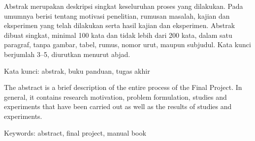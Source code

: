 
Abstrak merupakan deskripsi singkat keseluruhan proses  yang dilakukan. Pada umumnya berisi tentang motivasi penelitian, rumusan masalah, kajian dan eksperimen yang telah dilakukan serta hasil kajian dan eksperimen. Abstrak dibuat singkat, minimal 100 kata dan tidak lebih dari 200 kata, dalam satu paragraf, tanpa gambar, tabel, rumus, nomor urut, maupun subjudul. Kata kunci berjumlah 3--5, diurutkan menurut abjad. 

Kata kunci: abstrak, buku panduan, tugas akhir


The abstract is a brief description of the entire process of the Final Project. In general, it contains research motivation, problem formulation, studies and experiments that have been carried out as well as the results of studies and experiments. 

Keywords: abstract, final project, manual book
